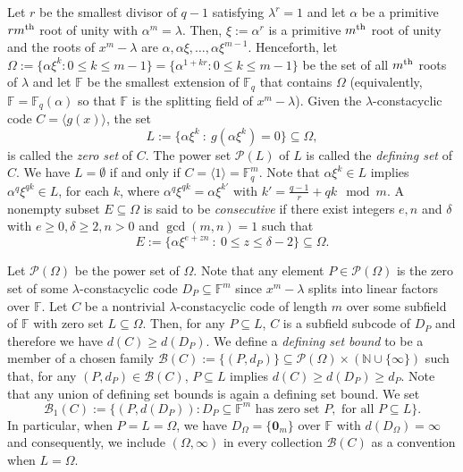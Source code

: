 \documentclass[11pt]{amsart}
\theoremstyle{plain}
\theoremstyle{definition}
\numberwithin{equation}{section}
\newcommand{\Fq}{\mathbb{F}_{q}}
\newcommand{\F}{{\mathbb F}}
\newcommand{\N}{\mathbb{N}}
\begin{document}
Let $r$ be the smallest divisor of $q-1$ satisfying $\lambda^r=1$ and let $\alpha$ be a primitive $rm^{\rm th}$ root of unity with $\alpha^m=\lambda$. Then, $\xi:=\alpha^r$ is a primitive $m^{\rm th}$ root of unity and the roots of $x^m-\lambda$ are $\alpha, \alpha\xi, \ldots, \alpha\xi^{m-1}$. Henceforth, let $\Omega :=\{\alpha\xi^k : 0\leq k \leq m-1\}=\{\alpha^{1+kr} : 0\leq k \leq m-1\}$ be the set of all $m^{\rm th}$ roots of $\lambda$ and let $\F$ be the smallest extension of $\Fq$ that contains $\Omega$ (equivalently, $\F=\Fq(\alpha)$ so that $\F$ is the splitting field of $x^m-\lambda$). Given the $\lambda$-constacyclic code $C=\langle g(x)\rangle$, the set 
$$L:=\{\alpha\xi^k\ :\ g(\alpha\xi^k)=0\}\subseteq \Omega,$$ is called the {\it zero set} of $C$. The power set $\mathcal{P}(L)$ of $L$ is called the {\it defining set} of $C$. We have $L=\emptyset$ if and only if $C=\langle 1\rangle = \Fq^m$. Note that $\alpha\xi^k\in L$ implies $\alpha^q\xi^{qk}\in L$, for each $k$, where $\alpha^q\xi^{qk}=\alpha\xi^{k'}$ with $k'=\frac{q-1}{r}+qk \mod m$. A nonempty subset $E\subseteq\Omega$ is said to be {\it consecutive} if there exist integers $e,n$ and $\delta$ with $e\geq 0,\delta \geq 2, n> 0$ and $\gcd(m,n)=1$ such that
\begin{equation} \label{cons zero set}
E:=\{\alpha\xi^{e+zn}\ :\ 0\leq z\leq \delta-2\}\subseteq\Omega.
\end{equation}

Let $\mathcal{P}(\Omega)$ be the power set of $\Omega$. Note that any element $P\in\mathcal{P}(\Omega)$ is the zero set of some $\lambda$-constacyclic code $D_P\subseteq\F^m$ since $x^m-\lambda$ splits into linear factors over $\F$.
Let $C$ be a nontrivial $\lambda$-constacyclic code of length $m$ over some subfield of $\F$ with zero set $L\subseteq \Omega$. Then, for any $P\subseteq L$, $C$ is a subfield subcode of $D_P$ and therefore we have $d(C)\geq d(D_P)$. 
We define a {\it defining set bound} to be a member of a chosen family $\mathcal{B}(C):=\{(P, d_P)\} \subseteq \mathcal{P}(\Omega) \times (\N \cup \{\infty\})$ such that, for any $(P, d_P)\in \mathcal{B}(C)$, $P\subseteq L$ implies $d(C) \geq d(D_P) \geq d_P$. Note that any union of defining set bounds is again a defining set bound. We set 
\begin{equation*}\mathcal{B}_1(C) := \{(P, d(D_P)) : D_P\subseteq\F^m \mbox{\ has\ zero\ set\ } P, \mbox{\ for\ all\ } P\subseteq L\}.
\end{equation*}
In particular, when $P=L=\Omega$, we have $D_{\Omega}=\{\mathbf{0}_m\}$ over $\F$ with $d(D_{\Omega})=\infty$ and consequently, we include $(\Omega,\infty)$ in every collection $\mathcal{B}(C)$ as a convention when $L=\Omega$.
\end{document}
